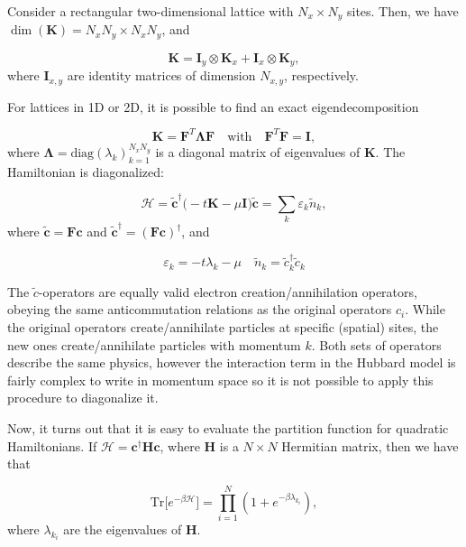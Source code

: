 Consider a rectangular two-dimensional lattice with $N_x \times N_y$ sites. Then, we have $\dim(\bm K) = N_x N_y \times N_x N_y $, and

\begin{equation}
\bm K = \bm I_y \otimes \bm K_x + \bm I_x \otimes \bm K_y ,
\end{equation}
where $\bm I_{x, y}$ are identity matrices of dimension $N_{x, y}$, respectively.

For lattices in 1D or 2D, it is possible to find an exact eigendecomposition

\begin{equation}
\bm K = \bm F^T \bm \Lambda \bm F \quad \text{with}  \quad \bm F^T \bm F = \bm I ,
\end{equation}
where $\bm \Lambda = \text{diag}(\lambda_k)_{k = 1}^{N_x N_y}$ is a diagonal matrix of eigenvalues of $\bm K$. The Hamiltonian is diagonalized:

\begin{equation}\label{eq:quadraticH}
\mathcal{H} =\tilde{\bm c}^\dagger \big( -t \bm K - \mu \bm I \big) \tilde{\bm c} = \sum_k \varepsilon_k \tilde{n}_k ,
\end{equation}
where $\tilde{\bm c} = \bm F \bm c$ and $\tilde{\bm c}^\dagger = (\bm F \bm c)^\dagger$, and

\begin{equation}
\varepsilon_k = -t \lambda_k - \mu \quad \tilde{n}_k = \tilde{c}_k^\dagger \tilde{c}_k
\end{equation}

The $\tilde{c}$-operators are equally valid electron creation/annihilation operators, obeying the same anticommutation relations as the original operators $c_i$. While the original operators create/annihilate particles at specific (spatial) sites, the new ones create/annihilate particles with momentum $k$. Both sets of operators describe the same physics, however the interaction term in the Hubbard model is fairly complex to write in momentum space so it is not possible to apply this procedure to diagonalize it.

\bigskip

Now, it turns out that it is easy to evaluate the partition function for quadratic Hamiltonians. If $\mathcal{H} = \bm c^\dagger \bm H \bm c$, where $\bm H$ is a $N \times N$ Hermitian matrix, then we have that

\begin{equation}\label{eq:trace_quadratic}
\text{Tr} \big[ e^{-\beta \mathcal{H} } \big] = \prod_{i=1}^N ( 1 + e^{-\beta \lambda_{k_i} } ) ,
\end{equation}
where $\lambda_{k_i}$ are the eigenvalues of $\bm H$.

